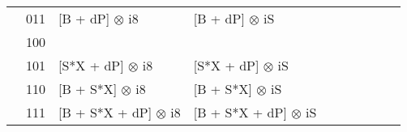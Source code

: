 \documentclass{article}
\begin{document}
\begin{adjustbox}{width=1\textwidth}
\begin{tabular}{|ll|llllllll|}
\multicolumn{1}{|l|}{}                    & 011      & \multicolumn{1}{l|}{{[}B + dP{]} $\otimes$ i8}       & \multicolumn{1}{l|}{{[}B + dP{]} $\otimes$ iS}       & \multicolumn{1}{l|}{}                                   & \multicolumn{1}{l|}{}                                   & \multicolumn{1}{l|}{}                                              & \multicolumn{1}{l|}{}                                              & \multicolumn{1}{l|}{}                                              &                                               \\ \cline{2-4}
\multicolumn{1}{|l|}{}                    & 100      & \multicolumn{1}{l|}{}                                & \multicolumn{1}{l|}{}                                & \multicolumn{1}{l|}{}                                   & \multicolumn{1}{l|}{}                                   & \multicolumn{1}{l|}{}                                              & \multicolumn{1}{l|}{}                                              & \multicolumn{1}{l|}{}                                              &                                               \\ \cline{2-4}
\multicolumn{1}{|l|}{}                    & 101      & \multicolumn{1}{l|}{{[}S*X + dP{]} $\otimes$ i8}     & \multicolumn{1}{l|}{{[}S*X + dP{]} $\otimes$ iS}     & \multicolumn{1}{l|}{}                                   & \multicolumn{1}{l|}{}                                   & \multicolumn{1}{l|}{}                                              & \multicolumn{1}{l|}{}                                              & \multicolumn{1}{l|}{}                                              &                                               \\ \cline{2-4}
\multicolumn{1}{|l|}{}                    & 110      & \multicolumn{1}{l|}{{[}B + S*X{]} $\otimes$ i8}      & \multicolumn{1}{l|}{{[}B + S*X{]} $\otimes$ iS}      & \multicolumn{1}{l|}{}                                   & \multicolumn{1}{l|}{}                                   & \multicolumn{1}{l|}{}                                              & \multicolumn{1}{l|}{}                                              & \multicolumn{1}{l|}{}                                              &                                               \\ \cline{2-4}
\multicolumn{1}{|l|}{}                    & 111      & \multicolumn{1}{l|}{{[}B + S*X + dP{]} $\otimes$ i8} & \multicolumn{1}{l|}{{[}B + S*X + dP{]} $\otimes$ iS} & \multicolumn{1}{l|}{}                                   & \multicolumn{1}{l|}{}                                   & \multicolumn{1}{l|}{}                                              & \multicolumn{1}{l|}{}                                              & \multicolumn{1}{l|}{}                                              &                                               \\ \hline

\end{tabular}
\end{adjustbox}
\end{document}
